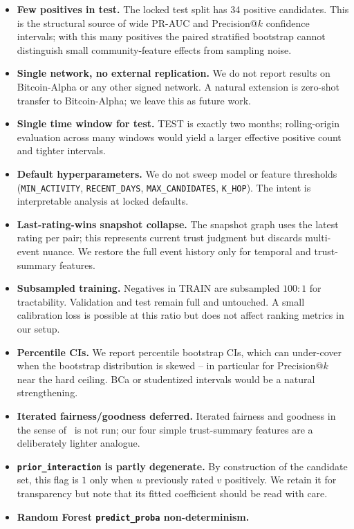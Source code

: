 \documentclass[conference]{IEEEtran}
\newcommand{\code}[1]{\texttt{#1}}
\begin{document}
\begin{itemize}
\item \textbf{Few positives in test.} The locked test split has 34
positive candidates. This is the structural source of wide PR-AUC and
Precision@$k$ confidence intervals; with this many positives the
paired stratified bootstrap cannot distinguish small community-feature
effects from sampling noise.
\item \textbf{Single network, no external replication.} We do not
report results on Bitcoin-Alpha or any other signed network. A
natural extension is zero-shot transfer to Bitcoin-Alpha; we leave
this as future work.
\item \textbf{Single time window for test.} TEST is exactly two
months; rolling-origin evaluation across many windows would yield a
larger effective positive count and tighter intervals.
\item \textbf{Default hyperparameters.} We do not sweep model or
feature thresholds (\code{MIN\_ACTIVITY}, \code{RECENT\_DAYS},
\code{MAX\_CANDIDATES}, \code{K\_HOP}). The intent is interpretable
analysis at locked defaults.
\item \textbf{Last-rating-wins snapshot collapse.} The snapshot graph
uses the latest rating per pair; this represents current trust
judgment but discards multi-event nuance. We restore the full event
history only for temporal and trust-summary features.
\item \textbf{Subsampled training.} Negatives in TRAIN are subsampled
$100{:}1$ for tractability. Validation and test remain full and
untouched. A small calibration loss is possible at this ratio but does
not affect ranking metrics in our setup.
\item \textbf{Percentile CIs.} We report percentile bootstrap CIs,
which can under-cover when the bootstrap distribution is skewed -- in
particular for Precision@$k$ near the hard ceiling. BCa or
studentized intervals would be a natural strengthening.
\item \textbf{Iterated fairness/goodness deferred.} Iterated
fairness and goodness in the sense of~\cite{kumar2016} is not run; our
four simple trust-summary features are a deliberately lighter
analogue.
\item \textbf{\code{prior\_interaction} is partly degenerate.} By
construction of the candidate set, this flag is $1$ only when $u$
previously rated $v$ positively. We retain it for transparency but
note that its fitted coefficient should be read with care.
\item \textbf{Random Forest \texttt{predict\_proba} non-determinism.}

\end{itemize}
\end{document}

